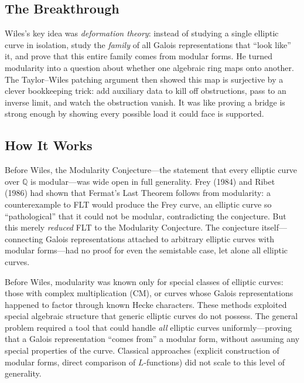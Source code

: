 \subsection{The Breakthrough}
Wiles's key idea was \emph{deformation theory}: instead of studying a single elliptic curve in isolation, study the \emph{family} of all Galois representations that ``look like'' it, and prove that this entire family comes from modular forms. He turned modularity into a question about whether one algebraic ring maps onto another. The Taylor--Wiles patching argument then showed this map is surjective by a clever bookkeeping trick: add auxiliary data to kill off obstructions, pass to an inverse limit, and watch the obstruction vanish. It was like proving a bridge is strong enough by showing every possible load it could face is supported.

\subsection{How It Works}

Before Wiles, the Modularity Conjecture---the statement that every elliptic curve over $\mathbb{Q}$ is modular---was wide open in full generality. Frey (1984) and Ribet (1986) had shown that Fermat's Last Theorem follows from modularity: a counterexample to FLT would produce the Frey curve, an elliptic curve so ``pathological'' that it could not be modular, contradicting the conjecture. But this merely \emph{reduced} FLT to the Modularity Conjecture. The conjecture itself---connecting Galois representations attached to arbitrary elliptic curves with modular forms---had no proof for even the semistable case, let alone all elliptic curves.

Before Wiles, modularity was known only for special classes of elliptic curves: those with complex multiplication (CM), or curves whose Galois representations happened to factor through known Hecke characters. These methods exploited special algebraic structure that generic elliptic curves do not possess. The general problem required a tool that could handle \emph{all} elliptic curves uniformly---proving that a Galois representation ``comes from'' a modular form, without assuming any special properties of the curve. Classical approaches (explicit construction of modular forms, direct comparison of $L$-functions) did not scale to this level of generality.

